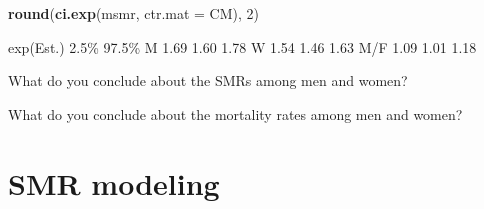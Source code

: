 \documentclass[
]{book}
\newenvironment{Shaded}{\begin{snugshade}}{\end{snugshade}}
\newcommand{\AttributeTok}[1]{\textcolor[rgb]{0.13,0.29,0.53}{#1}}
\newcommand{\DecValTok}[1]{\textcolor[rgb]{0.00,0.00,0.81}{#1}}
\newcommand{\FunctionTok}[1]{\textcolor[rgb]{0.13,0.29,0.53}{\textbf{#1}}}
\newcommand{\NormalTok}[1]{#1}
\begin{document}
\begin{enumerate}
\begin{Shaded}
\begin{Highlighting}[]
\FunctionTok{round}\NormalTok{(}\FunctionTok{ci.exp}\NormalTok{(msmr, }\AttributeTok{ctr.mat =}\NormalTok{ CM), }\DecValTok{2}\NormalTok{)}
\end{Highlighting}
\end{Shaded}

\begin{Shaded}
\begin{Highlighting}[]
\NormalTok{    exp(Est.) 2.5\% 97.5\%}
\NormalTok{M        1.69 1.60  1.78}
\NormalTok{W        1.54 1.46  1.63}
\NormalTok{M/F      1.09 1.01  1.18}
\end{Highlighting}
\end{Shaded}

  What do you conclude about the SMRs among men and women?

  What do you conclude about the mortality rates among men and women?
\end{enumerate}

\section{SMR modeling}\label{smr-modeling}
\end{document}
